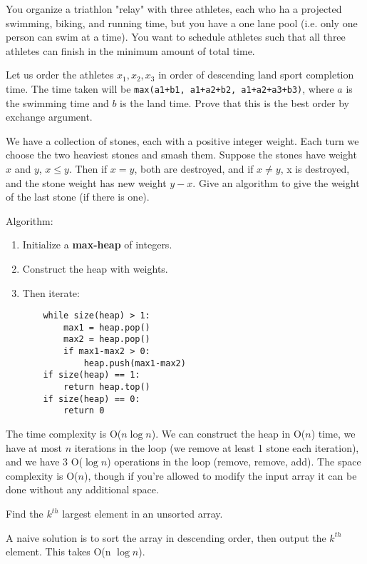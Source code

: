 \documentclass[11pt]{article}
\begin{document}
\begin{exmp}
You organize a triathlon "relay" with three athletes, each who ha a projected swimming, biking, and running time, but you have a one lane pool (i.e. only one person can swim at a time). You want to schedule athletes such that all three athletes can finish in the minimum amount of total time.
\end{exmp}
Let us order the athletes $x_1, x_2, x_3$ in order of descending land sport completion time. The time taken will be \texttt{max(a1+b1, a1+a2+b2, a1+a2+a3+b3)}, where $a$ is the swimming time and $b$ is the land time. Prove that this is the best order by exchange argument.

\begin{exmp}
We have a collection of stones, each with a positive integer weight. Each turn we choose the two heaviest stones and smash them. Suppose the stones have weight $x$ and $y$, $x \leq y$. Then if $x = y$, both are destroyed, and if $x \neq y$, x is destroyed, and the stone weight has new weight $y-x$. Give an algorithm to give the weight of the last stone (if there is one).
\end{exmp}
Algorithm:
\begin{enumerate}
    \item Initialize a \textbf{max-heap} of integers.
    \item Construct the heap with weights.
    \item Then iterate:
    \begin{verbatim}
    while size(heap) > 1:
        max1 = heap.pop()
        max2 = heap.pop()
        if max1-max2 > 0: 
            heap.push(max1-max2)
    if size(heap) == 1:
        return heap.top()
    if size(heap) == 0:
        return 0
    \end{verbatim}
\end{enumerate}
The time complexity is O($n \log n$). We can construct the heap in O($n$) time, we have at most $n$ iterations in the loop (we remove at least 1 stone each iteration), and we have 3 O($\log n$) operations in the loop (remove, remove, add). The space complexity is O($n$), though if you're allowed to modify the input array it can be done without any additional space.

\begin{exmp}
Find the $k^{th}$ largest element in an unsorted array.
\end{exmp}
A naive solution is to sort the array in descending order, then output the $k^{th}$ element. This takes O(n $\log n$).
\end{document}

